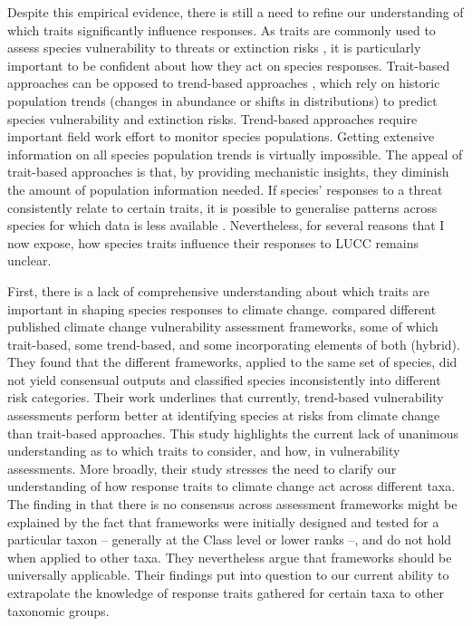Despite this empirical evidence, there is still a need to refine our understanding of which traits significantly influence responses. As traits are commonly used to assess species vulnerability to threats or extinction risks \citep{Pacifici2015, Willis2015,Bohm2016}, it is particularly important to be confident about how they act on species responses. Trait-based approaches can be opposed to trend-based approaches \citep{Pacifici2015}, which rely on historic population trends (changes in abundance or shifts in distributions) to predict species vulnerability and extinction risks. Trend-based approaches require important field work effort to monitor species populations. Getting extensive information on all species population trends is virtually impossible. The appeal of trait-based approaches is that, by providing mechanistic insights, they diminish the amount of population information needed. If species’ responses to a threat consistently relate to certain traits, it is possible to generalise patterns across species for which data is less available \citep{Verberk2013}. Nevertheless, for several reasons that I now expose, how species traits influence their responses to LUCC remains unclear.

First, there is a lack of comprehensive understanding about which traits are important in shaping species responses to climate change. \citet{Wheatley2017} compared different published climate change vulnerability assessment frameworks, some of which trait-based, some trend-based, and some incorporating elements of both (hybrid). They found that the different frameworks, applied to the same set of species, did not yield consensual outputs and classified species inconsistently into different risk categories. Their work underlines that currently, trend-based vulnerability assessments perform better at identifying species at risks from climate change than trait-based approaches. This study highlights the current lack of unanimous understanding as to which traits to consider, and how, in vulnerability assessments. More broadly, their study stresses the need to clarify our understanding of how response traits to climate change act across different taxa. The finding in \citet{Wheatley2017} that there is no consensus across assessment frameworks might be explained by the fact that frameworks were initially designed and tested for a particular taxon – generally at the Class level or lower ranks –, and do not hold when applied to other taxa. They nevertheless argue that frameworks should be universally applicable. Their findings put into question to our current ability to extrapolate the knowledge of response traits gathered for certain taxa to other taxonomic groups. 


